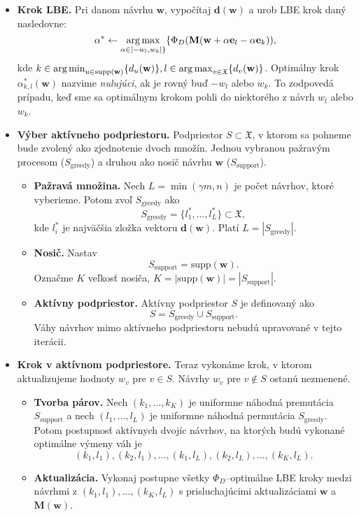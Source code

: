 \begin{itemize}
	\item \textbf{Krok LBE.} Pri danom návrhu $\mathbf w$, vypočítaj $\mathbf {d(w)}$ a urob LBE krok daný nasledovne: $$\alpha^* \leftarrow \operatorname*{arg\,max}_{\alpha \in [-w_l, w_k] \}} \{ \Phi_D(\mathbf M(\mathbf w+\alpha \mathbf e_l -\alpha \mathbf e_k)),$$ kde 
	$k \in \operatorname*{arg\,min}_{u \in \text{supp}(\mathbf w)} \{ d_u(\mathbf w)\}, l \in \operatorname*{arg\,max}_{v \in \mathfrak X} \{ d_v(\mathbf w)\}$. Optimálny krok $\alpha^*_{k,l}(\mathbf w)$ nazvime \textit{nulujúci}, ak je rovný buď $-w_l$ alebo $w_k$. To zodpovedá prípadu, keď sme sa optimálnym krokom pohli do niektorého z návrh $w_l$ alebo $w_k$.

	\item \textbf{Výber aktívneho podpriestoru.} Podpriestor $S \subset \mathfrak X$, v ktorom sa pohneme bude zvolený ako zjednotenie dvoch množín. Jednou vybranou pažravým procesom ($S_\text{greedy}$) a druhou ako nosič návrhu $\mathbf w$ ($S_\text{support}$).
	\begin{itemize}
		\item \textbf{Pažravá množina.} Nech $L=\min (\gamma m, n)$ je počet návrhov, ktoré vyberieme. Potom zvoľ $S_\text{greedy}$ ako $$S_\text{greedy} = \{l_1^*, \dots, l_L^* \} \subset \mathfrak X,$$ kde $l_i^*$ je najväčšia zložka vektoru $\mathbf d(\mathbf w)$. Platí $L=|S_\text{greedy}|$.
		\item \textbf{Nosič.} Nastav $$S_\text{support}=\text{supp}(\mathbf w).$$ Označme $K$ veľkosť nosiča, $K= |\text{supp}(\mathbf w)|=|S_\text{support}|$.
		\item \textbf{Aktívny podpriestor.} Aktívny podpriestor $S$ je definovaný ako $$S=S_\text{greedy} \cup S_\text{support}.$$ Váhy návrhov mimo aktívneho podpriestoru nebudú upravované v tejto iterácii.
	\end{itemize}

	\item \textbf{Krok v aktívnom podpriestore.} Teraz vykonáme krok, v ktorom aktualizujeme hodnoty $w_v$ pre $v \in S$. Návrhy $w_v$ pre $v \not \in S$ ostanú nezmenené.
	\begin{itemize}
		\item \textbf{Tvorba párov.} Nech $(k_1, \dots, k_K)$ je uniformne náhodná premutácia $S_\text{support}$ a nech $(l_1, \dots, l_L)$ je uniformne náhodná permutácia $S_\text{greedy}$. Potom postupnosť aktívnych dvojíc návrhov, na ktorých budú vykonané optimálne výmeny váh je $$ (k_1,l_1), (k_2, l_1), \dots, (k_1, l_L), (k_2,l_L), \dots, (k_K, l_L). $$
		\item \textbf{Aktualizácia.} Vykonaj postupne všetky $\Phi_D$--optimálne LBE kroky medzi návrhmi z $ (k_1,l_1), \dots, (k_K, l_L)$ s prisluchajúcimi aktualizáciami $\mathbf w$ a $\mathbf {M(w)}$.
	\end{itemize}
\end{itemize}


